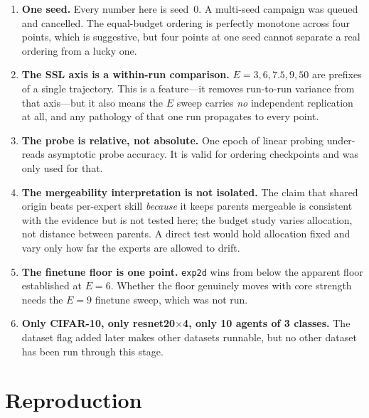 \documentclass[11pt,a4paper]{article}
\newcommand{\code}[1]{\texttt{\small #1}}
\begin{document}
\begin{enumerate}[leftmargin=*]
\item \textbf{One seed.} Every number here is seed~0. A multi-seed campaign was
      queued and cancelled. The equal-budget ordering is perfectly monotone
      across four points, which is suggestive, but four points at one seed
      cannot separate a real ordering from a lucky one.
\item \textbf{The SSL axis is a within-run comparison.} $E{=}3,6,7.5,9,50$ are
      prefixes of a single trajectory. This is a feature---it removes
      run-to-run variance from that axis---but it also means the $E$ sweep
      carries \emph{no} independent replication at all, and any pathology of
      that one run propagates to every point.
\item \textbf{The probe is relative, not absolute.} One epoch of linear probing
      under-reads asymptotic probe accuracy. It is valid for ordering
      checkpoints and was only used for that.
\item \textbf{The mergeability interpretation is not isolated.} The claim that
      shared origin beats per-expert skill \emph{because} it keeps parents
      mergeable is consistent with the evidence but is not tested here; the
      budget study varies allocation, not distance between parents. A direct
      test would hold allocation fixed and vary only how far the experts are
      allowed to drift.
\item \textbf{The finetune floor is one point.} \code{exp2d} wins from below the
      apparent floor established at $E{=}6$. Whether the floor genuinely moves
      with core strength needs the $E{=}9$ finetune sweep, which was not run.
\item \textbf{Only CIFAR-10, only resnet20$\times$4, only 10 agents of 3
      classes.} The dataset flag added later makes other datasets runnable, but
      no other dataset has been run through this stage.
\end{enumerate}

\section{Reproduction}
\end{document}
